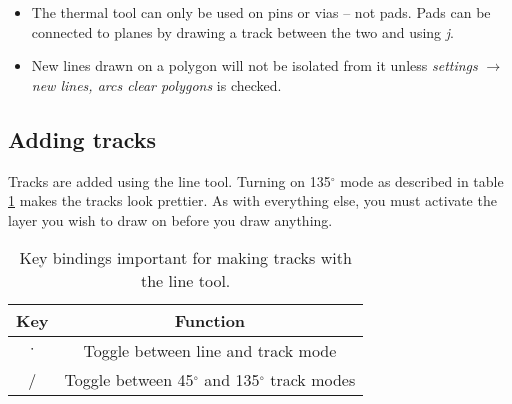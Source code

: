 \begin{itemize}
	\item The thermal tool can only be used on pins or vias -- not pads.  Pads can be connected to planes by drawing a track between the two and using \textsl{j}.
	\item New lines drawn on a polygon will not be isolated from it unless \textsl{settings} $\rightarrow$ \textsl{new lines, arcs clear polygons} is checked.
\end{itemize}


\clearpage
\subsection{Adding tracks}
Tracks are added using the line tool.  Turning on 135$^\circ$ mode as described in table \ref{track_table} makes the tracks look prettier.  As with everything else, you must activate the layer you wish to draw on before you draw anything.

\begin{table}[htb]
\begin{center}
\begin{tabular}{|c|c|}\hline
Key	&Function \\ \hline \hline

$\cdot$	&\parbox[c][1.5\height][c]{5cm}{Toggle between line and track mode}\\ \hline

/	&\parbox[c][1.5\height][c]{5cm}{Toggle between 45$^\circ$ and 135$^\circ$ track modes}\\ \hline
\end{tabular}
\end{center}
\caption{Key bindings important for making tracks with the line tool.\label{track_table}}
\end{table}

\clearpage
